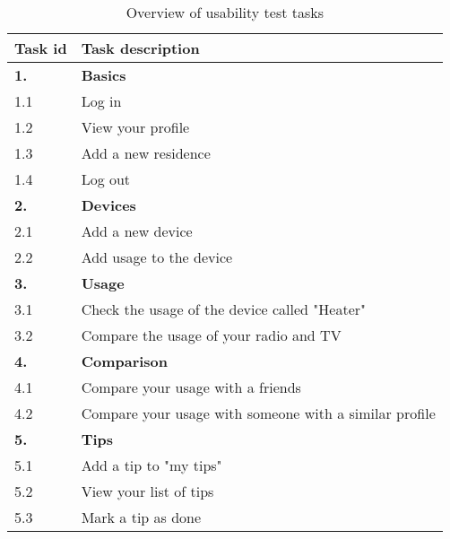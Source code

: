 \begin{table}[H]
\centering
\begin{tabular}{|l|p{10.5cm}|}
\hline
\textbf{Task id }& \textbf{Task description}\\\hline
\textbf{1.}&\textbf{Basics}\\\hline
1.1 & Log in\\\hline
1.2 & View your profile\\\hline
1.3 & Add a new residence\\\hline
1.4 & Log out\\\hline
\textbf{2.}&\textbf{Devices}\\\hline
2.1 & Add a new device\\\hline
2.2 & Add usage to the device\\\hline
\textbf{3.}&\textbf{Usage}\\\hline
3.1 & Check the usage of the device called "Heater"\\\hline
3.2 & Compare the usage of your radio and TV\\\hline
\textbf{4.}&\textbf{Comparison}\\\hline
4.1 & Compare your usage with a friends\\\hline
4.2 & Compare your usage with someone with a similar profile\\\hline
\textbf{5.}&\textbf{Tips}\\\hline
5.1 & Add a tip to "my tips"\\\hline
5.2 & View your list of tips\\\hline
5.3 & Mark a tip as done\\\hline
\end{tabular}
\caption{Overview of usability test tasks}
\label{tab:usabilityTests}
\end{table}